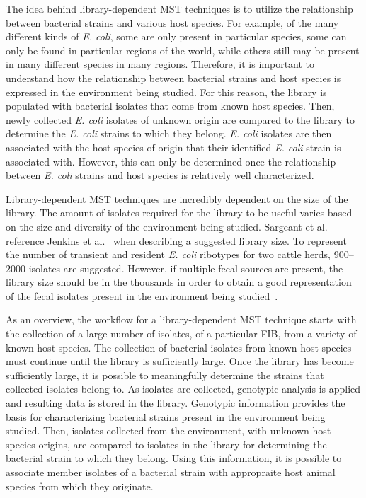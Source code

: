 \documentclass[12pt]{ucthesis}
\begin{document}
   The idea behind library-dependent MST techniques is to utilize
   the relationship between bacterial strains and various host species. For
   example, of the many different kinds of \textit{E. coli}, some are only
   present in particular species, some can only be found in particular regions
   of the world, while others still may be present in many different species in
   many regions. Therefore, it is important to understand how the relationship
   between bacterial strains and host species is expressed in the environment
   being studied. For this reason, the library is populated with bacterial
   isolates that come from known host species. Then, newly collected \textit{E.
   coli} isolates of unknown origin are compared to the library to determine
   the \textit{E. coli} strains to which they belong. \textit{E. coli} isolates
   are then associated with the host species of origin that their identified
   \textit{E. coli} strain is associated with. However, this can only be
   determined once the relationship between \textit{E. coli} strains and host
   species is relatively well characterized.

   Library-dependent MST techniques are incredibly dependent on the
   size of the library. The amount of isolates required for the library to be
   useful varies based on the size and diversity of the environment
   being studied. Sargeant et al.~\cite{Sargeant:ReviewMST} reference Jenkins
   et al.~\cite{Jenkins:Steers} when describing a suggested library size. To
   represent the number of transient and resident \textit{E. coli} ribotypes
   for two cattle herds, 900--2000 isolates are suggested. However, if multiple
   fecal sources are present, the library size should be in the thousands in
   order to obtain a good representation of the fecal isolates present in the
   environment being studied~\cite{Sargeant:ReviewMST}.

   As an overview, the workflow for a library-dependent MST technique starts
   with the collection of a large number of isolates, of a particular
   FIB, from a variety of known host species. The collection of bacterial
   isolates from known host species must continue until the library is
   sufficiently large. Once the library has become sufficiently large, it is
   possible to meaningfully determine the strains that collected isolates
   belong to. As isolates are collected, genotypic analysis is applied and
   resulting data is stored in the library. Genotypic information provides the
   basis for characterizing bacterial strains present in the environment being
   studied. Then, isolates collected from the environment, with unknown host
   species origins, are compared to isolates in the library for determining the
   bacterial strain to which they belong. Using this information, it is
   possible to associate member isolates of a bacterial strain with appropraite
   host animal species from which they originate.
\end{document}
